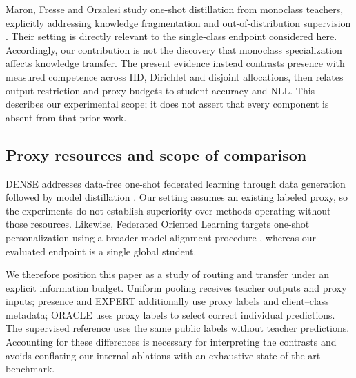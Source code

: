 Maron, Fresse and Orzalesi study one-shot distillation from monoclass teachers, explicitly addressing knowledge fragmentation and out-of-distribution supervision \cite{maron2025}. Their setting is directly relevant to the single-class endpoint considered here. Accordingly, our contribution is not the discovery that monoclass specialization affects knowledge transfer. The present evidence instead contrasts presence with measured competence across IID, Dirichlet and disjoint allocations, then relates output restriction and proxy budgets to student accuracy and NLL. This describes our experimental scope; it does not assert that every component is absent from that prior work.

\hypertarget{proxy-resources-and-scope-of-comparison}{%
\subsection{Proxy resources and scope of comparison}\label{proxy-resources-and-scope-of-comparison}}

DENSE addresses data-free one-shot federated learning through data generation followed by model distillation \cite{zhang2022}. Our setting assumes an existing labeled proxy, so the experiments do not establish superiority over methods operating without those resources. Likewise, Federated Oriented Learning targets one-shot personalization using a broader model-alignment procedure \cite{huang2025}, whereas our evaluated endpoint is a single global student.

We therefore position this paper as a study of routing and transfer under an explicit information budget. Uniform pooling receives teacher outputs and proxy inputs; presence and EXPERT additionally use proxy labels and client--class metadata; ORACLE uses proxy labels to select correct individual predictions. The supervised reference uses the same public labels without teacher predictions. Accounting for these differences is necessary for interpreting the contrasts and avoids conflating our internal ablations with an exhaustive state-of-the-art benchmark.
